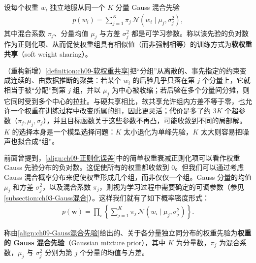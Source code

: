 \documentclass[../../main.tex]{subfiles}
\begin{document}
\begin{definition}[软权重共享]\label{definition:ch09-软权重共享}
设每个权重 $w_{i}$ 独立地服从同一个 $K$ 分量 Gauss 混合先验
\begin{align*}
p(w_{i})=\sum_{j=1}^{K}\pi_{j}\,\mathcal{N}\!\left(w_{i}\mid\mu_{j},\sigma_{j}^{2}\right),
\end{align*}
其中混合系数 $\pi_{j}$、分量均值 $\mu_{j}$ 与方差 $\sigma_{j}^{2}$ 都是可学习参数。称以该先验的负对数作为正则化项、从而促使权重组具有相似值（而非强制相等）的训练方式为\textbf{软权重共享}（soft weight sharing）。
\end{definition}

\begin{remark}（重构新增）\cref{definition:ch09-软权重共享}把“分组”从离散的、事先指定的约束变成连续的、由数据推断的聚类：若某个 $w_{i}$ 的后验几乎只落在第 $j$ 个分量上，它就相当于被“分配”到第 $j$ 组，并以 $\mu_{j}$ 为中心被收缩；若后验在多个分量间分摊，则它同时受到多个中心的拉扯。与硬共享相比，软共享允许组内方差不等于零，也允许一个权重在训练过程中改变所属的组，因此更灵活；代价是多了约 $3K$ 个超参数（$\pi_{j},\mu_{j},\sigma_{j}$），并且目标函数关于这些参数不再凸，可能收敛到不同的局部解。$K$ 的选择本身是一个模型选择问题：$K$ 太小退化为单峰先验，$K$ 太大则容易把噪声也拟合成“组”。
\end{remark}

前面曾提到，\eqref{align:ch09-正则化误差}中的简单权重衰减正则化项可以看作权重 Gauss 先验分布的负对数。这促使所有的权重都收敛到 $0$。但我们可以通过考虑 Gauss 混合概率分布来促使权重形成几个组，而非仅仅一个组。Gauss 分量的均值 $\mu_{j}$ 和方差 $\sigma_{j}^{2}$，以及混合系数 $\pi_{j}$，则视为学习过程中需要确定的可调参数（参见\cref{subsection:ch03-Gauss混合}）。这样我们就有了如下概率密度形式：
\begin{align}
p(\boldsymbol{w})=\prod_{i}\left\{\sum_{j=1}^{K}\pi_{j}\,\mathcal{N}\!\left(w_{i}\mid\mu_{j},\sigma_{j}^{2}\right)\right\}.
\label{align:ch09-Gauss混合先验}
\end{align}

\begin{definition}\label{definition:ch09-Gauss混合先验}
称由\eqref{align:ch09-Gauss混合先验}给出的、关于各分量独立同分布的权重先验为\textbf{权重的 Gauss 混合先验}（Gaussian mixture prior），其中 $K$ 为分量数，$\pi_{j}$ 为混合系数，$\mu_{j}$ 与 $\sigma_{j}^{2}$ 分别为第 $j$ 个分量的均值与方差。
\end{definition}
\end{document}
